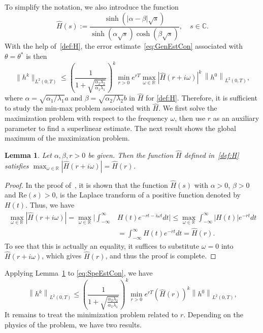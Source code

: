 \documentclass[reqno]{amsart}
\newtheorem{lemma}{Lemma}
\newcommand{\norm}[1]{\left\lVert#1\right\rVert}
\begin{document}
To simplify the notation, we also introduce the function \begin{equation}\label{def:H}
	\hat H(s) := \frac{\sinh\left(|\alpha-\beta|\sqrt{s}\right)}{\sinh\left(\alpha\sqrt{s}\right)\cosh\left(\beta\sqrt{s}\right)}, \quad s \in \mathbb{C}.
\end{equation}
With the help of~\eqref{def:H}, the error estimate~\eqref{eq:GenEstCon} associated with $\theta = \theta^*$ is then
\begin{equation}\label{eq:SpeEstCon}
\|h^k\|_{L^2(0, T)} \leq \left(\frac{1}{1+\sqrt{\frac{\alpha_2\lambda_2}{\alpha_1\lambda_1}}}\right)^k  \min_{r > 0} e^{rT}\max_{\omega \in \mathbb{R}} \left|\hat H(r + i \omega)\right|^k \, \norm{h^0}_{L^2(0, T)},
\end{equation}
where $\alpha = \sqrt{\alpha_1/\lambda_1} a$ and $\beta = \sqrt{\alpha_2/\lambda_2} b$ in $\hat H$ for \eqref{def:H}. Therefore, it is sufficient to study the min-max problem associated with $\hat H$. We first solve the maximization problem with respect to the frequency $\omega$, then use $r$ as an auxiliary parameter to find a superlinear estimate. The next result shows the global maximum of the maximization problem.


\begin{lemma}\label{lem:max}
	Let $\alpha, \beta, r>0$ be given. Then the function $\hat H$ defined in~\eqref{def:H} satisfies
	$\max_{\omega \in \mathbb{R}}|\hat H(r + i\omega)| = \hat H(r)$.
\end{lemma}
\begin{proof}
	In the proof of~\cite[Theorem 2]{ma:13}, it is shown that the function $\hat H(s)$ with $\alpha >0$, $\beta > 0$ and $\text{Re}(s)>0$, is the Laplace transform of a positive function denoted by $H(t)$. Thus, we have
\[\begin{aligned}
\max_{\omega \in \mathbb{R}} |\hat{H}(r + i \omega)| =  \max_{\omega \in \mathbb{R}} \Big| \int_{-\infty}^{\infty} &H(t) e^{-r t - i \omega t} dt \Big|
\leq \max_{\omega \in \mathbb{R}} \int_{-\infty}^{\infty} |H(t)|e^{-rt} dt  \\
&= \int_{-\infty}^{\infty} H(t)e^{-rt} dt  = \hat{H}(r).
\end{aligned}\] 
To see that this is actually an equality, it suffices to substitute $\omega = 0$ into $\hat{H}(r + i \omega)$, which gives $\hat{H}(r)$, and thus the proof is complete.
\end{proof}


Applying Lemma~\ref{lem:max} to \eqref{eq:SpeEstCon}, we have
\begin{equation}\label{eq:min-cont}
\norm{h^k}_{L^2(0, T)} \leq \left(\frac{1}{1+\sqrt{\frac{\alpha_2\lambda_2}{\alpha_1\lambda_1}}}\right)^k\min_{r>0}e^{rT} \left(\hat H(r)\right)^k \norm{h^0}_{L^2(0, T)},
\end{equation}
It remains to treat the minimization problem related to $r$. Depending on the physics of the problem, we have two results.
\end{document}
